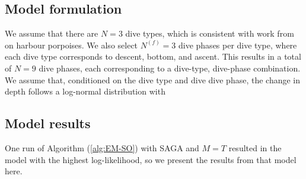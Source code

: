\subsection{Model formulation}

We assume that there are $N = 3$ dive types, which is consistent with work from \citet{Barajas:2017} on harbour porpoises. We also select $N^{(f)} = 3$ dive phases per dive type, where each dive type corresponds to descent, bottom, and ascent. This results in a total of $N = 9$ dive phases, each corresponding to a dive-type, dive-phase combination. We assume that, conditioned on the dive type and dive dive phase, the change in depth follows a log-normal distribution with

\subsection{Model results}

One run of Algorithm (\ref{alg:EM-SO}) with SAGA and $M=T$ resulted in the model with the highest log-likelihood, so we present the results from that model here.